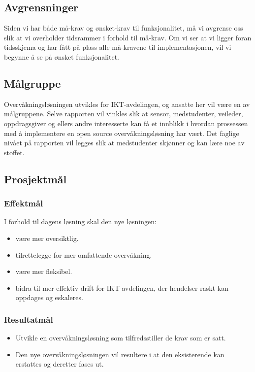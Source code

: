 \subsection{Avgrensninger}
Siden vi har både må-krav og ønsket-krav til funksjonalitet, må vi avgrense oss slik at vi overholder tidsrammer i forhold til må-krav. Om vi ser at vi ligger foran tidsskjema og har fått på plass alle må-kravene til implementasjonen, vil vi begynne å se på ønsket funksjonalitet.

\subsection{Målgruppe}
Overvåkningsløsningen utvikles for IKT-avdelingen, og ansatte her vil være en av målgruppene. Selve rapporten vil vinkles slik at sensor, medstudenter, veileder, oppdragsgiver og ellers andre interesserte kan få et innblikk i hvordan prossessen med å implementere en open source overvåkningsløsning har vært. Det faglige nivået på rapporten vil legges slik at medstudenter skjønner og kan lære noe av stoffet.

\subsection{Prosjektmål}
\subsubsection{Effektmål}
I forhold til dagens løsning skal den nye løsningen:
\begin{itemize}
	\item være mer oversiktlig.
	\item tilrettelegge for mer omfattende overvåkning.
	\item være mer fleksibel.
	\item bidra til mer effektiv drift for IKT-avdelingen, der hendelser raskt kan oppdages og eskaleres.
\end{itemize}

\subsubsection{Resultatmål}
\begin{itemize}
	\item Utvikle en overvåkningsløsning som tilfredsstiller de krav som er satt.
	\item Den nye overvåkningsløsningen vil resultere i at den eksisterende kan erstattes og deretter fases ut.
\end{itemize}

